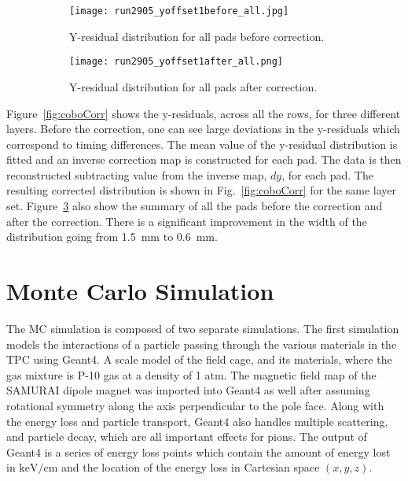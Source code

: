 \begin{figure}[!htb]
    \begin{subfigure}[t]{.49\textwidth}
        \centering
        \texttt{[image: run2905\_yoffset1before\_all.jpg]} 
        \caption{Y-residual distribution for all pads before correction.} \label{fig:yoff_allBefore}
    \end{subfigure}
    \hfill
    \begin{subfigure}[t]{.49\textwidth}
        \centering
        \texttt{[image: run2905\_yoffset1after\_all.png]}
        \caption{Y-residual distribution for all pads after correction.} \label{fig:yoff_allAfter}
    \end{subfigure}
    \caption{ }
\label{fig:yoff}
\end{figure}


 Figure~\ref{fig:coboCorr} shows the y-residuals, across all the rows, for three different layers. Before the correction, one can see large deviations in the y-residuals which correspond to timing differences. The mean value of the y-residual distribution is fitted and an inverse correction map is constructed for each pad. The data is then reconstructed subtracting value from the inverse map, $dy$, for each pad. The resulting corrected distribution is shown in Fig.~\ref{fig:coboCorr} for the same layer set. Figure~\ref{fig:yoff} also show the summary of all the pads before the correction and after the correction. There is a significant improvement in the width of the distribution going from \SI{1.5}{\milli\metre} to \SI{0.6}{\milli\metre}. 






\section{Monte Carlo Simulation}
\label{sec:monteCarlo}

The MC simulation is composed of two separate simulations. The first simulation models the interactions of a particle passing through the various materials in the TPC using Geant4. A scale model of the field cage, and its materials, where the gas mixture is P-10 gas at a density of 1 atm. The magnetic field map of the SAMURAI dipole magnet was imported into Geant4 as well after assuming rotational symmetry along the axis perpendicular to the pole face. Along with the energy loss and particle transport, Geant4 also handles multiple scattering, and particle decay, which are all important effects for pions. The output of Geant4 is a series of energy loss points which contain the amount of energy lost in $\si{\kilo\electronvolt\per\centi\metre}$ and the location of the energy loss in Cartesian space $(x,y,z)$. 

